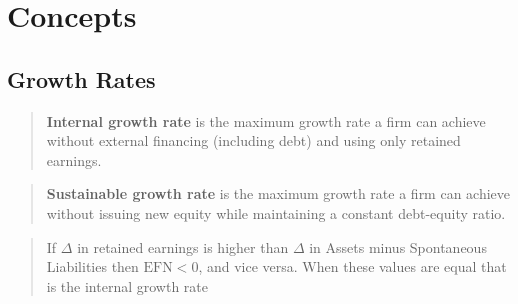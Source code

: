 \section{Concepts}
\subsection*{Growth Rates}
\blockquote{\textbf{Internal growth rate} is the maximum growth rate a
firm can achieve without external financing (including debt) and using
only retained earnings.}

\blockquote{\textbf{Sustainable growth rate} is the maximum growth rate
a firm can achieve without issuing new equity while maintaining a
constant debt-equity ratio.}

\blockquote{If $\Delta$ in retained earnings is higher than $\Delta$ in
Assets minus Spontaneous Liabilities then $\mathrm{EFN} < 0$, and vice
versa. When these values are equal that is the internal growth rate}